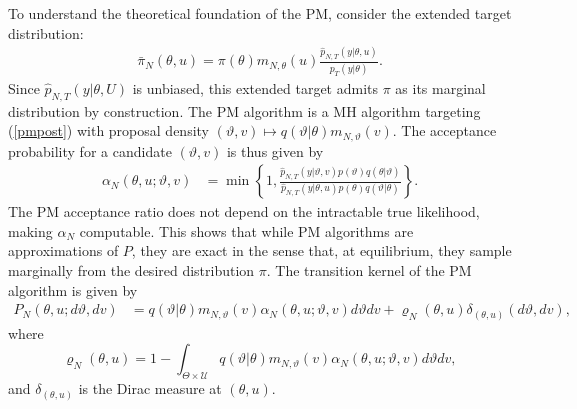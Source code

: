\documentclass[pdflatex,sn-mathphys-num]{sn-jnl}
\theoremstyle{thmstyleone}
\theoremstyle{thmstyletwo}
\theoremstyle{thmstylethree}
\begin{document}
To understand the theoretical foundation of the PM, consider the extended target distribution:
\begin{align}
\bar{\pi}_N(\theta,u) = \pi(\theta)m_{N,\theta}(u)\frac{\widehat{p}_{N,T}(y|\theta,u)}{p_T(y|\theta)}.
\label{pmpost}
\end{align}
Since $\widehat{p}_{N,T}(y \lvert \theta, U)$ is unbiased, this extended target admits $\pi$ as its marginal distribution by construction. The PM algorithm is a MH algorithm targeting (\ref{pmpost}) with proposal density 
$(\vartheta , v) \mapsto q(\vartheta\lvert\theta) m_{N,\vartheta}(v)$. 
The acceptance probability for a candidate $(\vartheta, v)$ is thus given by
\begin{align}
    \alpha_N\left(\theta,u ;  \vartheta,v\right) 
    &=\min \left\{1, \frac{\widehat{p}_{N,T}(y \lvert \vartheta, v) p(\vartheta) q(\theta \lvert \vartheta)}{\widehat{p}_{N,T}(y \lvert \theta, u) p(\theta) q(\vartheta \lvert\theta)}\right\}.
    \label{alphaN}
\end{align}
The PM acceptance ratio does not depend on the intractable true likelihood, making $\alpha_N$ computable. This shows that while PM algorithms are approximations of \(P\), they are exact in the sense that, at equilibrium, they sample marginally from the desired distribution \( \pi \). The transition kernel of the PM algorithm is given by
\begin{align}
    P_N(\theta, u; d\vartheta, dv) &= q(\vartheta \lvert \theta) m_{N,\vartheta}(v) \alpha_N(\theta, u; \vartheta, v) d\vartheta dv + \varrho_{N}(\theta, u) \delta_{(\theta, u)}(d\vartheta, dv),
\label{equa4}
\end{align}
where 
\begin{equation}
    \varrho_{N}(\theta, u) =  1 - \int
        _{\Theta \times \mathcal{U}} q(\vartheta \lvert \theta)m_{N,\vartheta}(v) \alpha_N(\theta, u; \vartheta, v) d\vartheta dv,
        \label{varrho}
\end{equation}
and $\delta_{(\theta, u)}$ is the Dirac measure at $(\theta, u)$. 
\end{document}
